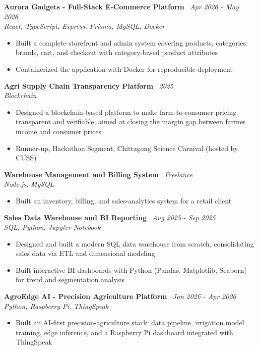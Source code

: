 \documentclass[10.5pt,a4paper]{article}
\newenvironment{tightitemize}{
  \begin{itemize}[leftmargin=15pt, itemsep=0pt, parsep=0pt, topsep=1pt]
}{
  \end{itemize}
}
\newcommand{\entrysimple}[2]{%
  \textbf{#1} \textbar\ \textit{#2}\\[1pt]
}
\begin{document}
\entrysimple{Aurora Gadgets - Full-Stack E-Commerce Platform}{Apr 2026 - May 2026}
\textit{React, TypeScript, Express, Prisma, MySQL, Docker}
\begin{tightitemize}
  \item Built a complete storefront and admin system covering products, categories, brands, cart, and checkout with category-based product attributes
  \item Containerized the application with Docker for reproducible deployment
\end{tightitemize}

\entrysimple{Agri Supply Chain Transparency Platform}{2025}
\textit{Blockchain}
\begin{tightitemize}
  \item Designed a blockchain-based platform to make farm-to-consumer pricing transparent and verifiable, aimed at closing the margin gap between farmer income and consumer prices
  \item Runner-up, Hackathon Segment, Chittagong Science Carnival (hosted by CUSS)
\end{tightitemize}

\entrysimple{Warehouse Management and Billing System}{Freelance}
\textit{Node.js, MySQL}
\begin{tightitemize}
  \item Built an inventory, billing, and sales-analytics system for a retail client
\end{tightitemize}

\entrysimple{Sales Data Warehouse and BI Reporting}{Aug 2025 - Sep 2025}
\textit{SQL, Python, Jupyter Notebook}
\begin{tightitemize}
  \item Designed and built a modern SQL data warehouse from scratch, consolidating sales data via ETL and dimensional modeling
  \item Built interactive BI dashboards with Python (Pandas, Matplotlib, Seaborn) for trend and segmentation analysis
\end{tightitemize}

\entrysimple{AgroEdge AI - Precision Agriculture Platform}{Jan 2026 - Apr 2026}
\textit{Python, Raspberry Pi, ThingSpeak}
\begin{tightitemize}
  \item Built an AI-first precision-agriculture stack: data pipeline, irrigation model training, edge inference, and a Raspberry Pi dashboard integrated with ThingSpeak
\end{tightitemize}
\end{document}
